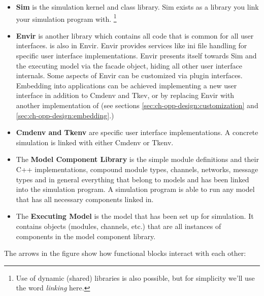 \begin{itemize}
  \item{\textbf{Sim} is the simulation kernel and class
    library. Sim exists as a library you link
    your simulation program with.
       \footnote{Use of dynamic (shared) libraries is also possible, but
       for simplicity we'll use the word \textit{linking} here.}
    }
  \item{\textbf{Envir} is another library which contains all code
    that is common for all user interfaces.  is also in Envir.
    Envir provides services like ini file handling for specific user interface
    implementations. Envir presents itself towards Sim and the executing model
    via the  facade object, hiding all other user interface internals.
    Some aspects of Envir can be customized via plugin
    interfaces. Embedding {\opp} into applications can
    be achieved implementing a new user interface in addition to Cmdenv and Tkev,
    or by replacing Envir with another implementation of 
    (see sections \ref{sec:ch-opp-design:customization} and
    \ref{sec:ch-opp-design:embedding}.)}
  \item{\textbf{Cmdenv and Tkenv} are specific user interface
    implementations. A concrete simulation is linked with
    either Cmdenv or Tkenv.}
  \item{The \textbf{Model Component Library} is the simple module definitions and
    their C++ implementations, compound module types, channels, networks,
    message types and in general everything that belong to models and
    has been linked into the simulation program. A simulation program is
    able to run any model that has all necessary components linked in.}
  \item{The \textbf{Executing Model} is the model that has been set up
    for simulation. It contains objects (modules, channels, etc.) that
    are all instances of components in the model component library.}
\end{itemize}

The arrows in the figure show how functional blocks interact with
each other:

